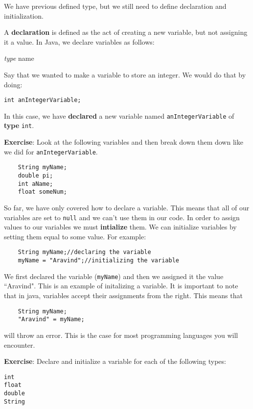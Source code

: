 \documentclass[11pt,fleqn]{article}
\begin{document}
We have previous defined type, but we still need to define declaration and
initialization. 

A \textbf{declaration} is defined as the act of creating a new variable, but not
assigning it a value. In Java, we declare variables as follows:

\textit{type} name

Say that we wanted to make a variable to store an integer. We would do that by
doing:

\begin{verbatim}
int anIntegerVariable;
\end{verbatim}

In this case, we have \textbf{declared} a new variable named
\texttt{anIntegerVariable} of \textbf{type} \texttt{int}. 

\textbf{Exercise}: Look at the following variables and then break down them down
like we did for \texttt{anIntegerVariable}. 

\begin{verbatim}
    String myName;
    double pi;
    int aName;
    float someNum;
\end{verbatim}

So far, we have only covered how to declare a variable. This means that all of
our variables are set to \texttt{null} and we can't use them in our code. In
order to assign values to our variables we must \textbf{intialize} them. We can
initialize variables by setting them equal to some value. For example:

\begin{verbatim}
    String myName;//declaring the variable
    myName = "Aravind";//initializing the variable
\end{verbatim}

We first declared the variable (\texttt{myName}) and then we assigned it the
value ``Aravind". This is an example of initalizing a variable. It is important
to note that in java, variables accept their assignments from the right. This
means that 

\begin{verbatim}
    String myName;
    "Aravind" = myName;
\end{verbatim}

will throw an error. This is the case for most programming languages you will
encounter.

\textbf{Exercise}: Declare and initialize a variable for each of the following
types: 

\begin{verbatim}
int
float
double
String
\end{verbatim}
\end{document}
